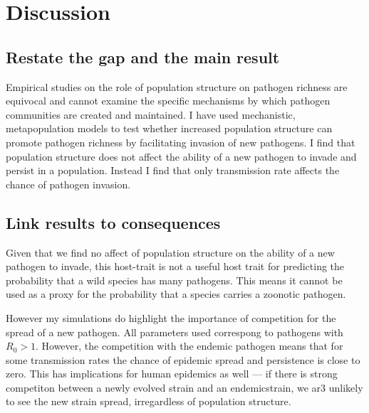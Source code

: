 
\clearpage
\section{Discussion}


\subsection{Restate the gap and the main result}

Empirical studies on the role of population structure on pathogen richness are equivocal and cannot examine the specific mechanisms by which pathogen communities are created and maintained.
I have used mechanistic, metapopulation models to test whether increased population structure can promote pathogen richness by facilitating invasion of new pathogens.
I find that population structure does not affect the ability of a new pathogen to invade and persist in a population.
Instead I find that only transmission rate affects the chance of pathogen invasion.


\subsection{Link results to consequences}

Given that we find no affect of population structure on the ability of a new pathogen to invade, this host-trait is not a useful host trait for predicting the probability that a wild species has many pathogens.
This means it cannot be used as a proxy for the probability that a species carries a zoonotic pathogen.

However my simulations do highlight the importance of competition for the spread of a new pathogen.
All parameters used correspong to pathogens with $R_0>1$.
However, the competition with the endemic pathogen means that for some transmission rates the chance of epidemic spread and persistence is close to zero.
This has implications for human epidemics as well --- if there is strong competiton between a newly evolved strain and an endemicstrain, we ar3 unlikely to see the new strain spread, irregardless of population structure.

